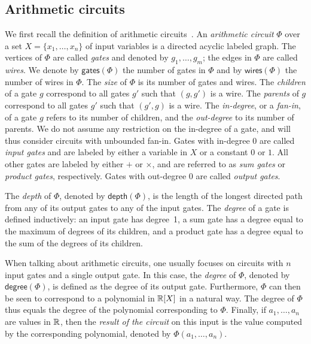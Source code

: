 \subsection{Arithmetic circuits}\label{subsect:ac}
We first recall the definition of arithmetic circuits~\cite{allender}. 
%
An \textit{arithmetic circuit} $\Phi$ over a set $X=\{x_1,\ldots,x_n\}$ of input variables 
is a directed acyclic labeled graph. The vertices of $\Phi$ are called \textit{gates} and 
denoted by $g_1,\ldots,g_m$; the edges in $\Phi$ are called \textit{wires}. We denote by 
$\mathsf{gates}(\Phi)$ the number of gates in $\Phi$ and by $\mathsf{wires}(\Phi)$ the number
of wires in $\Phi$. The \textit{size} of $\Phi$
is its number of gates and wires. 
%
The \textit{children} of a gate $g$ correspond to all gates $g'$ such that $(g,g')$ is a wire. 
The \textit{parents} of $g$ correspond to all gates $g'$ such that $(g',g)$ is a wire. The
\textit{in-degree}, or a \textit{fan-in}, of a gate $g$ refers to its number of children, and 
the \textit{out-degree} to its number of parents. We do not assume any restriction on the 
in-degree of a gate, and will thus consider circuits with unbounded fan-in. 
Gates with in-degree $0$ are called \textit{input gates} and are labeled by either a variable 
in $X$ or a constant $0$ or $1$. All other gates are labeled by either $+$ or $\times$, and 
are referred to as \textit{sum gates} or \textit{product gates}, respectively.
Gates with out-degree $0$ are called \textit{output gates}.


%
The \textit{depth} of $\Phi$, denoted
by $\mathsf{depth}(\Phi)$, is the length of the longest directed path from any of its output 
gates to any of the input gates. The \textit{degree} of a gate is defined inductively: an input 
gate has degree~1, a sum gate has a degree equal to the maximum of degrees of its children, 
and a product gate has a degree equal to the sum of the degrees of its children. 

When talking about arithmetic circuits, one usually focuses on circuits with $n$ input gates and a single output gate. In this case, 
the \textit{degree} of $\Phi$, denoted by $\mathsf{degree}(\Phi)$, is defined as the degree of its output gate. Furthermore, 
$\Phi$ can then be seen to correspond to a polynomial in $\mathbb{R}[X]$ in a natural way. The {degree} of $\Phi$ thus equals 
the degree of the polynomial corresponding to $\Phi$. Finally, if $a_1,\ldots ,a_n$ are values in $\mathbb{R}$, then 
the \textit{result of the circuit} on this input is the value computed by the corresponding polynomial, denoted by $\Phi(a_1,\ldots ,a_n)$.

